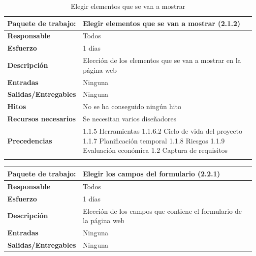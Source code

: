\documentclass{report}
\begin{document}
\begin{center}
\begin{longtable}{|p{6cm}|p{6cm}|}
                    \hline
                    \textbf{Paquete de trabajo:} & Elegir elementos que se van a mostrar (2.1.2)\\
                    \hline
                    \textbf{Responsable} & Todos\\
                    \hline
                    \textbf{Esfuerzo} & 1 días\\
                    \hline
                    \textbf{Descripción} & Elección de los elementos que se van a mostrar en la página web\\
                    \hline
                    \textbf{Entradas} & Ninguna\\
                    \hline
                    \textbf{Salidas/Entregables} & Ninguna \\
                    \hline
                    \textbf{Hitos} & No se ha conseguido ningún hito\\
                    \hline
                    \textbf{Recursos necesarios} & Se necesitan varios diseñadores\\
                    \hline
                    \textbf{Precedencias} & 1.1.5 Herramientas
                                            1.1.6.2 Ciclo de vida del proyecto
                                            1.1.7 Planificación temporal
                                            1.1.8 Riesgos
                                            1.1.9 Evaluación económica
                                            1.2 Captura de requisitos\\
                    \hline
                    \caption{Elegir elementos que se van a mostrar}
                \end{longtable}
                \begin{longtable}{|p{6cm}|p{6cm}|}
                    \hline
                    \textbf{Paquete de trabajo:} & Elegir los campos del formulario (2.2.1)\\
                    \hline
                    \textbf{Responsable} & Todos\\
                    \hline
                    \textbf{Esfuerzo} & 1 días\\
                    \hline
                    \textbf{Descripción} & Elección de los campos que contiene el formulario de la página web\\
                    \hline
                    \textbf{Entradas} & Ninguna\\
                    \hline
                    \textbf{Salidas/Entregables} & Ninguna \\

\end{longtable}
\end{center}
\end{document}
